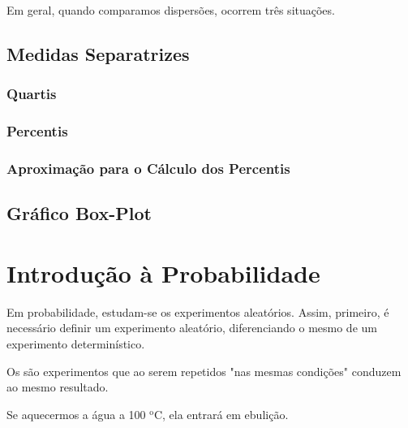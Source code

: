 \documentclass[11pt,fleqn]{book}
\numberwithin{mpicture}{chapter}
\numberwithin{mtable}{chapter}
\numberwithin{mframe}{chapter}
\begin{document}
Em geral, quando comparamos dispersões, ocorrem três situações.


\section{Medidas Separatrizes}

\subsection{Quartis}


\subsection{Percentis}


\subsection{Aproximação para o Cálculo dos Percentis}



\section{Gráfico Box-Plot}


\chapter{Introdução à Probabilidade}

Em probabilidade, estudam-se os experimentos aleatórios. Assim, primeiro, é necessário definir um experimento aleatório, diferenciando o mesmo de um experimento determinístico.

\begin{definition}
	Os  são experimentos que ao serem repetidos "nas mesmas condições" conduzem ao mesmo resultado.
\end{definition}

\begin{example}
	Se aquecermos a água a 100 $^{\text{o}}$C, ela entrará em ebulição.
\end{example}
\end{document}
